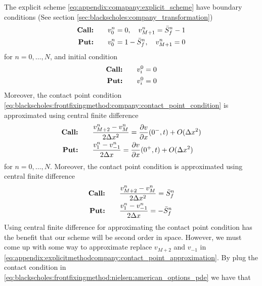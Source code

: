 The explicit scheme \eqref{eq:appendix:comapany:explicit_scheme} have boundary conditions (See section \ref{sec:blackscholes:company_transformation})
\begin{equation*}
    \begin{split}
        \text{\textbf{Call:}} \qquad & v^{n}_{0} = 0, \quad v^{n}_{M+1} = \bar{S}^{n}_{f} - 1 \\
        \text{\textbf{Put:}} \qquad & v^{n}_{0} = 1 - \bar{S}^{n}_{f}, \quad v^{n}_{M+1} = 0 \\
    \end{split}
\end{equation*}
for $n=0,\dots,N$, and initial condition 
\begin{equation*}
    \begin{split}
        \text{\textbf{Call:}} \qquad & v^0_i  = 0 \\
        \text{\textbf{Put:}} \qquad & v^0_i = 0 \\
    \end{split}
\end{equation*}
Moreover, the contact point condition \ref{eq:blackscholes:frontfixingmethod:company:contact_point_condition} is approximated using central finite difference
\begin{align*}
    \text{\textbf{Call:}} \qquad & \dfrac{v^{n}_{M+2} - v^{n}_{M}}{2\Delta{x}^2} = \dfrac{\partial{v}}{\partial{x}}(0^-, t) + O(\Delta{x}^2) \\
    \text{\textbf{Put:}} \qquad & \dfrac{v^{n}_{1} - v^{n}_{-1}}{2\Delta{x}} = \dfrac{\partial{v}}{\partial{x}}(0^+, t)+ O(\Delta{x}^2) 
\end{align*}
for $n=0,\dots,N$. Moreover, the contact point condition is approximated using central finite difference
\begin{align}
    \label{eq:appendix:explicitmethodcompany:contact_point_approximation}
    \text{\textbf{Call:}} \qquad & \dfrac{v^{n}_{M+2} - v^{n}_{M}}{2\Delta{x}^2} = \bar{S}^{n}_{f} \\
    \text{\textbf{Put:}} \qquad & \dfrac{v^{n}_{1} - v^{n}_{-1}}{2\Delta{x}}  = -\bar{S}^{n}_{f}  
\end{align}
Using central finite difference for approximating the contact point condition has the benefit that our scheme will be second order in space. However, we must come up with some way to approximate replace $v_{M+2}$ and $v_{-1}$ in \eqref{eq:appendix:explicitmethodcompany:contact_point_approximation}. By plug the contact condition in \eqref{eq:blackscholes:frontfixingmethod:nielsen:american_options_pde} we have that 
